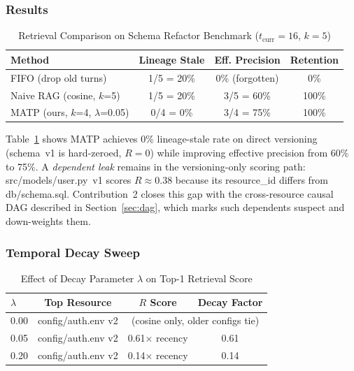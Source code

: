 \documentclass[lettersize,journal]{IEEEtran}
\begin{document}
\subsubsection{Results}

\begin{table}[!t]
\caption{Retrieval Comparison on Schema Refactor Benchmark ($t_{\text{curr}} = 16$, $k = 5$)\label{tab:retrieval}}
\centering
\begin{tabular}{lccc}
\toprule
\textbf{Method} & \textbf{Lineage Stale} & \textbf{Eff. Precision} & \textbf{Retention} \\
\midrule
FIFO (drop old turns) & 1/5 = 20\% & 0\% (forgotten) & 0\% \\
Naive RAG (cosine, $k$=5) & 1/5 = 20\% & 3/5 = 60\% & 100\% \\
MATP (ours, $k$=4, $\lambda$=0.05) & 0/4 = 0\% & 3/4 = 75\% & 100\% \\
\bottomrule
\end{tabular}
\end{table}

Table~\ref{tab:retrieval} shows MATP achieves 0\% lineage-stale rate on direct versioning (schema~v1 is hard-zeroed, $R = 0$) while improving effective precision from 60\% to 75\%. A \emph{dependent leak} remains in the versioning-only scoring path: src/models/user.py~v1 scores $R \approx 0.38$ because its resource\_id differs from db/schema.sql. Contribution~2 closes this gap with the cross-resource causal DAG described in Section~\ref{sec:dag}, which marks such dependents suspect and down-weights them.

\subsubsection{Temporal Decay Sweep}

\begin{table}[!t]
\caption{Effect of Decay Parameter $\lambda$ on Top-1 Retrieval Score\label{tab:decay}}
\centering
\begin{tabular}{lccc}
\toprule
$\lambda$ & Top Resource & $R$ Score & Decay Factor \\
\midrule
0.00 & config/auth.env v2 & \multicolumn{2}{c}{(cosine only, older configs tie)} \\
0.05 & config/auth.env v2 & 0.61× recency & 0.61 \\
0.20 & config/auth.env v2 & 0.14× recency & 0.14 \\
\bottomrule
\end{tabular}
\end{table}
\end{document}
